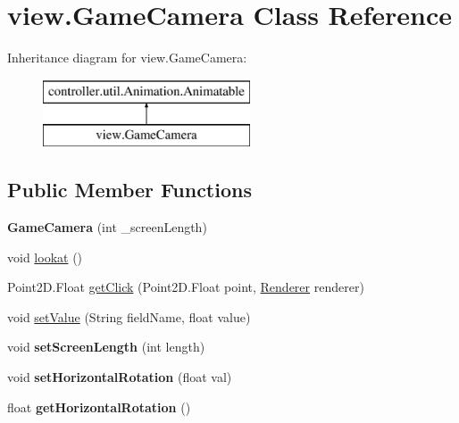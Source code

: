 \hypertarget{classview_1_1_game_camera}{\section{view.\-Game\-Camera Class Reference}
\label{classview_1_1_game_camera}
}
Inheritance diagram for view.\-Game\-Camera\-:\begin{figure}[H]
\begin{center}
\leavevmode
\includegraphics[height=2.000000cm]{classview_1_1_game_camera}
\end{center}
\end{figure}
\subsection*{Public Member Functions}
\begin{DoxyCompactItemize}
\item 
\hypertarget{classview_1_1_game_camera_ab70352e27060caac4c7b4b88a9f75599}{{\bfseries Game\-Camera} (int \-\_\-screen\-Length)}\label{classview_1_1_game_camera_ab70352e27060caac4c7b4b88a9f75599}

\item 
void \hyperlink{classview_1_1_game_camera_adbff38ab55a721adac1eee94d08b341c}{lookat} ()
\item 
Point2\-D.\-Float \hyperlink{classview_1_1_game_camera_afc47415637a247006ca8fb3b4999a671}{get\-Click} (Point2\-D.\-Float point, \hyperlink{classview_1_1_renderer}{Renderer} renderer)
\item 
void \hyperlink{classview_1_1_game_camera_a8ac82709b44bca56a57bdee66491cb73}{set\-Value} (String field\-Name, float value)
\item 
\hypertarget{classview_1_1_game_camera_a760e54d78dea29b1e789ed81941fd0df}{void {\bfseries set\-Screen\-Length} (int length)}\label{classview_1_1_game_camera_a760e54d78dea29b1e789ed81941fd0df}

\item 
\hypertarget{classview_1_1_game_camera_a5d7cfab90132464516798fe70ca062d1}{void {\bfseries set\-Horizontal\-Rotation} (float val)}\label{classview_1_1_game_camera_a5d7cfab90132464516798fe70ca062d1}

\item 
\hypertarget{classview_1_1_game_camera_a19e1f974cccf9607ffc2e9ee5826c8dc}{float {\bfseries get\-Horizontal\-Rotation} ()}\label{classview_1_1_game_camera_a19e1f974cccf9607ffc2e9ee5826c8dc}

\end{DoxyCompactItemize}


